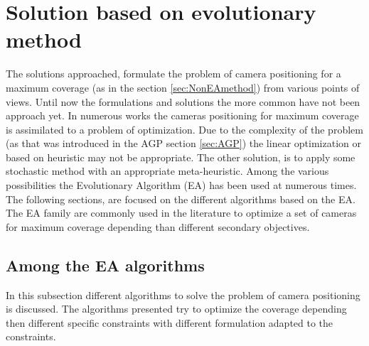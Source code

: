	
	\section{Solution based on evolutionary  method} \label{sec:SolutionBasedonEA}
	
	The solutions approached, formulate the problem of camera positioning for a maximum coverage (as in the section \ref{sec:NonEAmethod}) from various points of views. Until now the formulations and solutions the more common have not been approach yet.
In numerous works the cameras positioning for maximum coverage is assimilated to a problem of optimization. Due to the complexity of the problem (as that was introduced in the AGP section \ref{sec:AGP}) the linear optimization or based on heuristic may not be appropriate.  
The other solution, is to apply some stochastic method with an appropriate meta-heuristic. Among the various possibilities the Evolutionary Algorithm (EA) has been used at numerous times. 
The following sections, are focused on the different algorithms  based on the EA. The EA family are commonly used in the literature to optimize a set of cameras for maximum coverage depending than different secondary objectives.

\subsection{Among the EA algorithms}
In this subsection different algorithms to solve the problem of camera positioning is discussed. The algorithms presented try to optimize the coverage depending then different specific constraints with different formulation adapted to the constraints.

